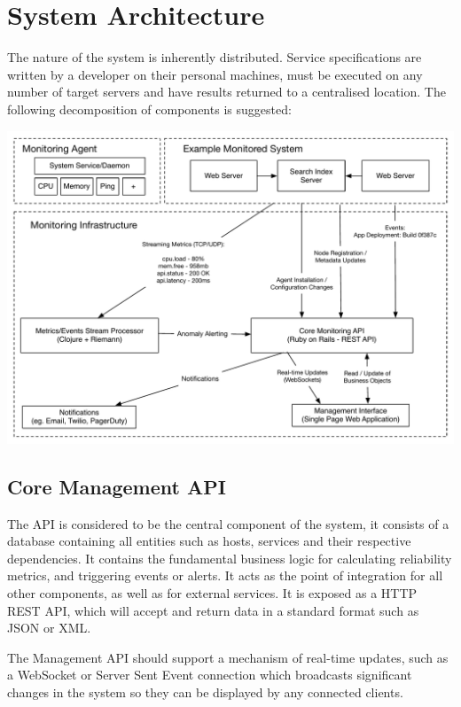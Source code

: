 \documentclass{cshonours}
\begin{document}
\pagebreak
\section{System Architecture}
\label{section:architecture}

The nature of the system is inherently distributed. Service specifications are written by a developer on their personal machines, must be executed on any number of target servers and have results returned to a centralised location. The following decomposition of components is suggested:

\begin{listing}[h]
\includegraphics[scale=0.6]{architecture.pdf}
\end{listing}

\subsection{Core Management API}

The API is considered to be the central component of the system, it consists of a database containing all entities such as hosts, services and their respective dependencies. It contains the fundamental business logic for calculating reliability metrics, and triggering events or alerts. It acts as the point of integration for all other components, as well as for external services. It is exposed as a HTTP REST API, which will accept and return data in a standard format such as JSON or XML.

The Management API should support a mechanism of real-time updates, such as a WebSocket or Server Sent Event connection which broadcasts significant changes in the system so they can be displayed by any connected clients.
\end{document}
